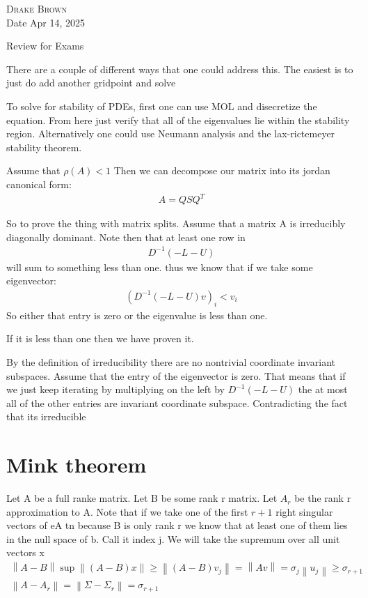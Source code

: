 \documentclass[12pt]{article}
\newcommand{\norm}[1]{\left\lVert#1\right\rVert}
\begin{document}
\DeclarePairedDelimiter\floor{\lfloor}{\rfloor}
\DeclarePairedDelimiter\ceil{\lceil}{\rceil}


\begin{flushright}
	\textsc{Drake Brown}  \\
	Date Apr 14, 2025
\end{flushright}
\begin{center}
	Review for Exams
\end{center}
There are a couple of different ways that one could address this. The easiest is to just do add another gridpoint and solve

To solve for stability of PDEs, first one can use MOL and disecretize the equation. From here just verify that all of the eigenvalues lie within the stability region. Alternatively one could use Neumann analysis and the lax-rictemeyer stability theorem.

Assume that $\rho(A)<1$ Then we can decompose our matrix into its jordan canonical form:
\begin{align*}
	A=QSQ^T
\end{align*}

So to prove the thing with matrix splits. Assume that a matrix A is irreducibly diagonally dominant. Note then that at least one row in
\begin{align*}
	D^{-1}(-L-U)
\end{align*}
will sum to something less than one. thus we know that if we take some eigenvector:
\begin{align*}
	(D^{-1}(-L-U)v)_i<v_i
\end{align*}
So either that entry is zero or the eigenvalue is less than one.


If it is less than one then we have proven it.

By the definition of irreducibility there are no nontrivial coordinate invariant subspaces. Assume that the entry of the eigenvector is zero. That means that if we just keep iterating by multiplying on the left by $D^{-1}(-L-U)$ the at most all of the other entries are invariant coordinate subspace. Contradicting the fact that its irreducible
\section{Mink theorem}
Let A be a full ranke matrix. Let B be some rank r matrix. Let $A_r$ be the rank r approximation to A. Note that if we take one of the first $r+1$ right singular vectors of eA tn because B is only rank r we know that at least one of them lies in the null space of b. Call it index j. We will take the supremum over all unit vectors x
\begin{align*}
	\norm{A-B}  \sup \norm{(A-B)x}\geq \norm{(A-B)v_j}=\norm{Av} = \sigma_j\norm{u_j}\geq \sigma_{r+1} \\
	\norm{A-A_{r}}=\norm{\Sigma-\Sigma_{r}}=\sigma_{r+1}
\end{align*}
\end{document}
